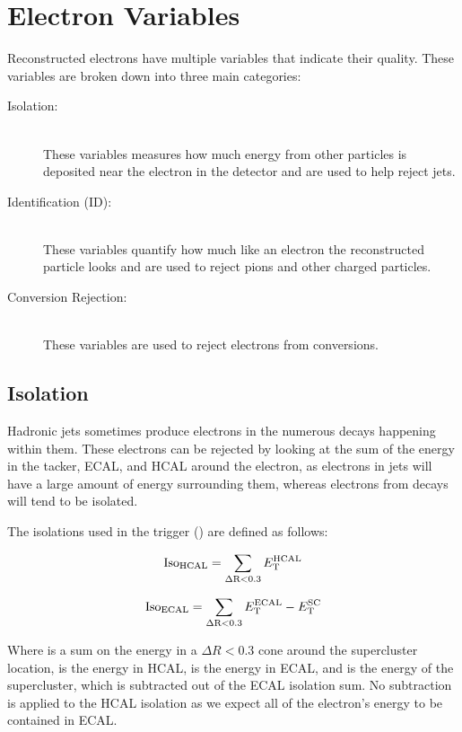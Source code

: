 \section{Electron Variables}
\label{sec:electron_variables}

Reconstructed electrons have multiple variables that indicate their quality.
These variables are broken down into three main categories:

\begin{description}
    \item[Isolation:] \hfill \\
        These variables measures how much energy from other particles is
        deposited near the electron in the detector and are used to help reject
        jets.
    \item[Identification (ID):] \hfill \\
        These variables quantify how much like an electron the reconstructed
        particle looks and are used to reject pions and other charged
        particles.
    \item[Conversion Rejection:] \hfill \\
        These variables are used to reject electrons from \photontoee
        conversions.
\end{description}

\subsection{Isolation}

Hadronic jets sometimes produce electrons in the numerous decays happening
within them. These electrons can be rejected by looking at the sum of the
energy in the tacker, ECAL, and HCAL around the electron, as electrons in jets
will have a large amount of energy surrounding them, whereas electrons from \Z
decays will tend to be isolated.

The isolations used in the trigger (\SingleElectronTrigger) are defined as
follows:

\begin{equation}
    \text{Iso}_{\text{HCAL}} = \sum_{\Delta \text{R}<0.3} E_{\mathrm{T}}^{\text{HCAL}}
\end{equation}

\begin{equation}
    \text{Iso}_{\text{ECAL}} = \sum_{\Delta \text{R}<0.3} E_{\mathrm{T}}^{\text{ECAL}} - E_{\mathrm{T}}^{\text{SC}}
\end{equation}

Where \DeltaRSum is a sum on the energy in a $\Delta R < 0.3$ cone around the
supercluster location, \ETHCAL is the energy in HCAL, \ETECAL is the energy in
ECAL, and \ETSC is the energy of the supercluster, which is subtracted out of
the ECAL isolation sum. No subtraction is applied to the HCAL isolation as we
expect all of the electron's energy to be contained in ECAL.

